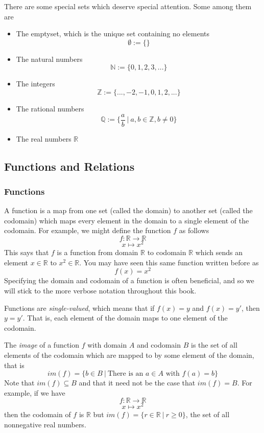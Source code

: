 \documentclass[12pt]{article}
\begin{document}
There are some special sets which deserve special attention. Some among them are
\begin{itemize}
  \item The emptyset, which is the unique set containing no elements
  \[
    \emptyset := \{\}
  \]
  \item The natural numbers
  \[
    \mathbb{N} := \{0, 1, 2, 3,...\}
  \]
  \item The integers
  \[
    \mathbb{Z} := \{...,-2,-1,0,1,2,...\}
  \]
  \item The rational numbers
  \[
    \mathbb{Q} := \{\frac{a}{b}\ |\ a, b \in \mathbb{Z}, b \neq 0\}
  \]
  \item The real numbers $\mathbb{R}$
\end{itemize}

\subsection{Functions and Relations}
\subsubsection*{Functions}
A function is a map from one set (called the domain) to another set (called the codomain) which maps every element in the domain to a single element of the codomain. For example, we might define the function $f$ as follows
\[
  f : \mathbb{R} \rightarrow \mathbb{R}
\]
\[
  x \mapsto x^2
\]
This says that $f$ is a function from domain $\mathbb{R}$ to codomain $\mathbb{R}$ which sends an element $x \in \mathbb{R}$ to $x^2 \in \mathbb{R}$. You may have seen this same function written before as 
\[
  f(x) = x^2
\]
Specifying the domain and codomain of a function is often beneficial, and so we will stick to the more verbose notation throughout this book. 

Functions are \emph{single-valued}, which means that if $f(x) = y$ and $f(x) = y'$, then $y = y'$. That is, each element of the domain maps to one element of the codomain. 

The \emph{image} of a function $f$ with domain $A$ and codomain $B$ is the set of all elements of the codomain which are mapped to by some element of the domain, that is
\[
   im(f) = \{b \in B\ |\ \text{There is an } a \in A \text{ with } f(a) = b\}
 \] 
Note that $im(f) \subseteq B$ and that it need not be the case that $im(f) = B$. For example, if we have 
\[
  f : \mathbb{R} \rightarrow \mathbb{R}
\]
\[
  x \mapsto x^2
\]
then the codomain of $f$ is $\mathbb{R}$ but $im(f) = \{r \in \mathbb{R}\ |\ r \geq 0\}$, the set of all nonnegative real numbers. 
\end{document}
